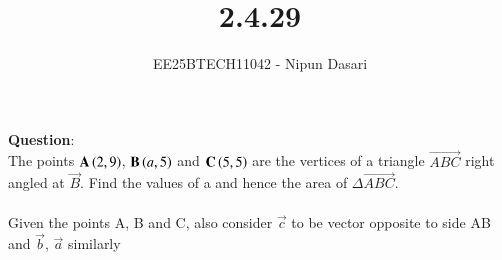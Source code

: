 \documentclass[journal]{IEEEtran}
\begin{document}
	
	
	\vspace{3cm}
	
	\title{2.4.29}
	\author{EE25BTECH11042 - Nipun Dasari}
	\maketitle
	{\let\newpage\relax\maketitle}
	
	\renewcommand{\thefigure}{\theenumi}
	\renewcommand{\thetable}{\theenumi}
	\setlength{\intextsep}{10pt} %
	
	
	\renewcommand{\thetable}{\theenumi}
	
	\textbf{Question}:\\
	The points $\mathbf{A}\left(2, 9\right)$, $\mathbf{B}\left(a, 5\right)$ and $\mathbf{C}\left(5, 5\right)$ are the vertices of a triangle $\vec{ABC}$ right angled
	at $\vec{B}$. Find the values of a and hence the area of $\Delta\vec{ABC}$. \\ 
	\solution \\
	
	Given the points A, B and C, also consider $\vec{c}$ to be vector opposite to side AB and $\vec{b}$, $\vec{a}$ similarly
	
\end{document}
